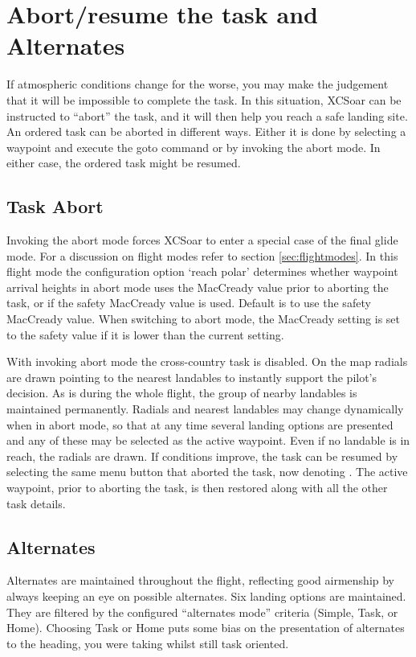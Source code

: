 \section{Abort/resume the task and Alternates}

If atmospheric conditions change for the worse, you may make the
judgement that it will be impossible to complete the task.  In this
situation, XCSoar can be instructed to ``abort'' the task, and it will
then help you reach a safe landing site. An ordered task can be aborted in 
different ways. Either it is done by selecting a waypoint and execute the goto 
command or by invoking the abort mode. In either case, the ordered task might be resumed.

\subsection*{Task Abort}\label{sec:taskabort}
Invoking the abort mode forces XCSoar to enter a special case of the final glide mode.  For a discussion on 
flight modes refer to section \ref{sec:flightmodes}. In this flight mode
the configuration option `reach polar' determines whether
waypoint arrival heights in abort mode uses the MacCready value prior
to aborting the task, or if the safety MacCready value is used. 
Default is to use the safety MacCready value.  When switching to
abort mode, the MacCready setting is set to the safety value 
if it is lower than the current setting.

With invoking abort mode the cross-country task is disabled. On the map radials 
are drawn pointing to the nearest landables to instantly 
support the pilot's decision. As is during the whole flight, the group of nearby 
landables is maintained permanently. Radials and nearest landables may change 
dynamically when in abort mode, so that at any time several landing options are 
presented and any of these may be selected as the active waypoint. Even if no 
landable is in reach, the radials are drawn.
If conditions improve, the task can be resumed by selecting the same
menu button that aborted the task, now denoting . The active 
waypoint, prior to aborting the task, is then restored along with all the other 
task details.

\subsection*{Alternates} \label{sec:alternates}
Alternates are maintained throughout the flight, reflecting good airmenship by 
always keeping an eye on possible alternates. Six landing 
options are maintained. They are filtered by the configured ``alternates mode'' 
criteria (Simple, Task, or Home).  
Choosing Task or Home puts some bias on the presentation of alternates to the 
heading, you were taking whilst still task oriented.

